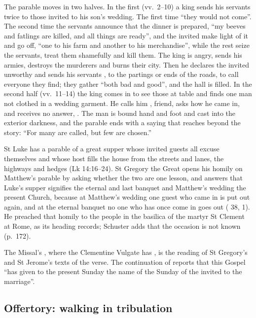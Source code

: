 The parable moves in two halves. In the first (vv.~2--10) a king sends his
servants twice to those invited to his son's wedding. The first time ``they
would not come''. The second time the servants announce that the dinner is
prepared, ``my beeves and fatlings are killed, and all things are ready'', and
the invited make light of it and go off, ``one to his farm and another to his
merchandise'', while the rest seize the servants, treat them shamefully and
kill them. The king is angry, sends his armies, destroys the murderers and
burns their city. Then he declares the invited unworthy and sends his servants
, to the partings or ends of the roads, to call
everyone they find; they gather ``both bad and good'', and the hall is filled.
In the second half (vv.~11--14) the king comes in to see those at table and
finds one man not clothed in a wedding garment. He calls him ,
friend, asks how he came in, and receives no answer, . The man is bound hand and foot and cast into the exterior darkness,
and the parable ends with a saying that reaches beyond the story: ``For many
are called, but few are chosen.''

St Luke has a parable of a great supper whose invited guests all excuse
themselves and whose host fills the house from the streets and lanes, the
highways and hedges (Lk 14:16--24). St Gregory the Great opens his homily on
Matthew's parable by asking whether the two are one lesson, and answers that
Luke's supper signifies the eternal and last banquet and Matthew's wedding the
present Church, because at Matthew's wedding one guest who came in is put out
again, and at the eternal banquet no one who has once come in goes out
( 38, 1). He preached that homily to the people in
the basilica of the martyr St Clement at Rome, as its heading records;
Schuster adds that the occasion is not known (p.~172).

The Missal's , where the Clementine Vulgate has
, is the reading of St Gregory's and St Jerome's texts of the
verse. The continuation of  reports that this Gospel
``has given to the present Sunday the name of the Sunday of the invited to the
marriage''.

\subsection{Offertory: walking in tribulation}

